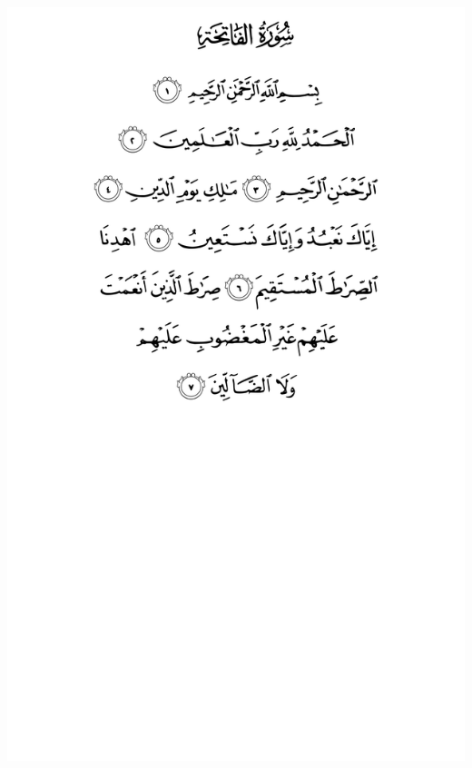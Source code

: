 \documentclass[10pt]{article}
\begin{document}
\pagestyle{fancy}

\lhead{}\chead{}\rhead{}

\lfoot{}
\cfoot{\thepage}
\rfoot{}

\renewcommand{\headrulewidth}{0.4pt}
\renewcommand{\footrulewidth}{0pt}

\begin{center}
\includegraphics[width=\textwidth,height=\textheight,keepaspectratio]{images/001.png}\newpage

\end{center}
\end{document}

